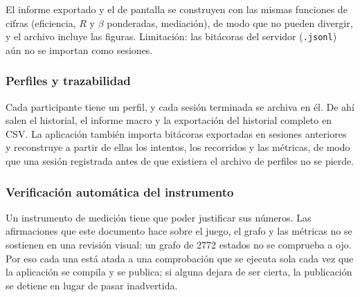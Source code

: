 \documentclass{book}
\begin{document}
El informe exportado y el de pantalla se construyen con las mismas funciones de cifras (eficiencia, $R$ y $\beta$ ponderadas, mediación), de modo que no pueden divergir, y el archivo incluye las figuras. Limitación: las bitácoras del servidor (\texttt{.jsonl}) aún no se importan como sesiones.

\subsubsection{Perfiles y trazabilidad}

Cada participante tiene un perfil, y cada sesión terminada se archiva en
él. De ahí salen el historial, el informe macro y la exportación del
historial completo en CSV. La aplicación también importa bitácoras
exportadas en sesiones anteriores y reconstruye a partir de ellas los
intentos, los recorridos y las métricas, de modo que una sesión registrada
antes de que existiera el archivo de perfiles no se pierde.

\subsubsection{Verificación automática del instrumento}

Un instrumento de medición tiene que poder justificar sus números. Las
afirmaciones que este documento hace sobre el juego, el grafo y las
métricas no se sostienen en una revisión visual: un grafo de 2772 estados
no se comprueba a ojo. Por eso cada una está atada a una comprobación que
se ejecuta sola cada vez que la aplicación se compila y se publica; si
alguna dejara de ser cierta, la publicación se detiene en lugar de pasar
inadvertida.
\end{document}
